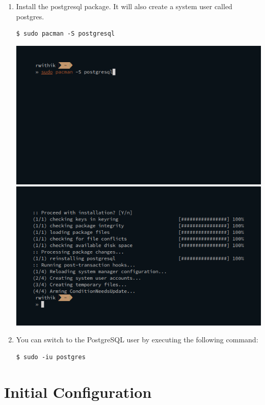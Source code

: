 \documentclass[10pt,a4paper,titlepage]{report}
\begin{document}
{\begin{enumerate}
	\item Install the postgresql package. It will also create a system user called postgres. 
		\begin{verbatim}
$ sudo pacman -S postgresql
		\end{verbatim}
		\includegraphics[width=\linewidth]{../Images/Installation/1.png}\newline
		\includegraphics[width=\linewidth]{../Images/Installation/2.png}\newline
		\item You can switch to the PostgreSQL user by executing the following command:
		\begin{verbatim}
$ sudo -iu postgres
		\end{verbatim}
\end{enumerate}

\section{Initial Configuration}

}
\end{document}

